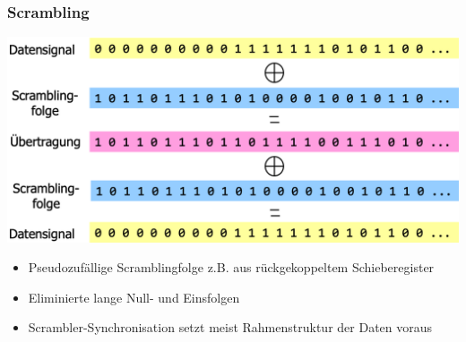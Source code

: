 \subsubsection{Scrambling}
\begin{center}
    \includegraphics[width=\linewidth]{graphic/signale_analyisieren/Scrambling.png}
\end{center}
\vspace{-8pt}
\begin{itemize}
    \item Pseudozufällige Scramblingfolge z.B. aus rückgekoppeltem Schieberegister
    \item Eliminierte lange Null- und Einsfolgen
    \item Scrambler-Synchronisation setzt meist Rahmenstruktur der Daten voraus
\end{itemize}



